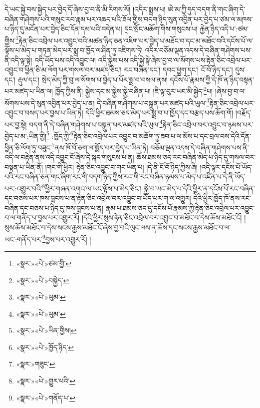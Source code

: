 དེ་ཡང་སྐྱེ་བས་སྐྱེད་པར་བྱེད་དོ་ཞེས་བྱ་བ་ནི་མི་རིགས་སོ། །འདིར་སྨྲས་པ། ཨེ་མ་ཀྱི་ཧུད་བདག་ནི་གང་ཞིག་དེ་བཞིན་གཤེགས་པའི་གསུང་རབ་རྣམ་པར་འཆད་པའི་ཟོལ་གྱིས་བདག་ཉིད་སུན་འབྱིན་པར་བྱེད་པ་ཙམ་ལ་མཁས་པ་ཉིད་དུ་མངོན་པར་བྱེད་ཅིང་དོན་དམ་པའི་བདེན་པ། དྲང་སྲོང་མཆོག་གིས་གསུངས་པ། རྐྱེན་ཉིད་འདི་པ་:ཙམ་གྱིས་\footnote{«སྣར་»«པེ་»ཙམ་གྱི་}རྟེན་ཅིང་འབྲེལ་པར་འབྱུང་བའི་མཚན་ཉིད་ཅན་འཇིག་པར་བྱེད་པ་མཐོང་བ་དང་མ་མཐོང་བའི་དངོས་པོ་ལ་ལྟོས་པ་མེད་པ་གཏན་མེད་པར་སྨྲ་བ་ཁྱོད་ལ་ཤིན་ཏུ་འཇིགས་ཏེ། འདིར་བཅོམ་ལྡན་འདས་དེ་བཞིན་གཤེགས་པས་ནི་འདི་ལྟ་སྟེ། འདི་ཡོད་པས་འདི་འབྱུང་ལ། འདི་སྐྱེས་པས་འདི་སྐྱེ་སྟེ་ཞེས་བྱ་བ་ལ་སོགས་པས་རྟེན་ཅིང་འབྲེལ་པར་འབྱུང་བ་ཕྱིན་ཅི་མ་ལོག་པར་གསལ་བར་མཛད་ཅིང་། རང་བཞིན་དང་། དབང་ཕྱུག་དང་། ངོ་བོ་ཉིད་དང་། དུས་དང་། རྡུལ་དང་། སྲེད་མེད་ཀྱི་བུ་ལ་སོགས་པ་བྱེད་པ་པོར་སྨྲ་བ་བསལ་ནས། དངོས་པོ་རྣམས་ཀྱི་དེ་ཁོ་ན་ཉིད་བསྟན་པར་མཛད་པ་ཡིན་ལ། ཁྱོད་ཀྱིས་ནི། སྐྱེས་དང་མ་སྐྱེས་སྐྱེ་བཞིན་པ། །ཇི་ལྟ་བུར་ཡང་མི་སྐྱེད་\footnote{«སྣར་»«པེ་»བསྐྱེད་}པ། །ཞེས་བྱ་བ་ལ་སོགས་པས་དེ་སུན་འབྱིན་པར་བྱེད་པ་ན། དེ་བཞིན་གཤེགས་པ་བསྐྲུན་པར་མཛད་པའི་ཡུལ་\footnote{«སྣར་»«པེ་»ཡུམ་}རྟེན་ཅིང་འབྲེལ་པར་འབྱུང་བ་བསད་པར་བྱས་པ་ཡིན་ཏེ། དེའི་ཕྱིར་ཐམས་ཅད་མེད་པར་སྨྲ་བ་པ་ཁྱོད་དང་བརྩད་པས་ཆོག་གོ། །བརྗོད་པར་བྱ་སྟེ། བདག་ནི་དེ་བཞིན་གཤེགས་པ་བསྐྲུན་པར་མཛད་པའི་ཡུལ་\footnote{«སྣར་»«པེ་»ཡུམ་}རྟེན་ཅིང་འབྲེལ་བར་འབྱུང་བ་ཉམས་པར་བྱེད་པ་མ་:ཡིན་གྱི།\footnote{«སྣར་»«པེ་»ཡིན་གྱིས།} :ཁྱོད་ཀྱི་\footnote{«སྣར་»«པེ་»ཁྱོད་ཉིད་}རྟེན་ཅིང་འབྲེལ་པར་འབྱུང་བ་མཆོག་ཏུ་ཟབ་པ་ལ་མོས་པ་དང་བྲལ་བས་དེའི་དོན་ཕྱིན་ཅི་ལོག་ཏུ་བཟུང་\footnote{«སྣར་»གཟུང་}ནས་ཁོ་བོ་ཅག་ལ་སྨོད་པར་བྱེད་པ་ཡིན་ཏེ། བཅོམ་ལྡན་འདས་དེ་བཞིན་གཤེགས་པས་ནི་འདི་ལ་བརྟེན་ནས་འདི་འབྱུང་ངོ་ཞེས་དེ་སྐད་གསུངས་པ་ན། ཆོས་ཐམས་ཅད་རང་བཞིན་མེད་པ་ཉིད་དུ་གསལ་བར་བསྟན་པ་ཡིན་ནོ། །གང་གི་ཕྱིར། རྟེན་ཅིང་འབྱུང་བ་གང་ཡིན་པ། །དེ་ནི་ངོ་བོ་ཉིད་ཀྱིས་ཞི། །འདི་ལྟར་དངོས་པོ་ཡོད་པའི་རང་བཞིན་ཅན་གང་ཞིག་རང་གི་བདག་ཉིད་ཀྱིས་རང་གི་རང་བཞིན་ཉམས་པ་མེད་པ་འཛིན་པ་དེ་ནི་ཡོད་པར་:འགྱུར་བའི་\footnote{«སྣར་»«པེ་»གྱུར་པའི་}ཕྱིར་གཞན་འགའ་ལ་ཡང་ལྟོས་པ་མེད་ཅིང་། སྐྱེ་བ་ཡང་མེད་པ་དེའི་ཕྱིར་ན་དངོས་པོ་རང་བཞིན་དང་བཅས་པར་ཁས་བླངས་པ་ན་རྟེན་ཅིང་འབྲེལ་བར་འབྱུང་བ་ཡོད་པར་ག་ལ་འགྱུར། དེའི་ཕྱིར་ཁྱོད་ཁོ་ནས་རང་བཞིན་དང་བཅས་པ་ཉིད་དུ་ཁས་བླངས་པ་ན། རྣམ་པ་ཐམས་ཅད་དུ་དངོས་པོ་རྣམས་ཀྱི་རྟེན་ཅིང་འབྲེལ་པར་འབྱུང་བ་ལ་གནོད་པ་བྱས་པར་འགྱུར་རོ། །དེའི་ཕྱིར་སུས་རྟེན་ཅིང་འབྲེལ་བར་འབྱུང་བ་མཐོང་བ་དེས་ཆོས་མཐོང་ངོ། །སུས་ཆོས་མཐོང་བ་དེས་སངས་རྒྱས་མཐོང་ངོ་ཞེས་བྱ་བའི་ལུང་ལས་ན་ཆོས་དང་སངས་རྒྱས་མཐོང་བ་ལ་ཡང་:གནོད་པར་\footnote{«སྣར་»«པེ་»གནོད་པ་}བྱས་པར་འགྱུར་རོ། །
